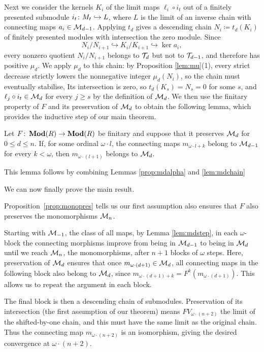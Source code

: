\documentclass[runningheads]{llncs}
\begin{document}
Next we consider the kernels $K_i$ of the limit maps $\ell_i\circ i_t$ out of a finitely presented submodule $i_t\colon M_t\hookrightarrow L$, where $L$ is the limit of an inverse chain with connecting maps $a_i\in\mathcal{M}_{d-1}$.
Applying $t_d$ gives a descending chain $N_i\coloneqq t_d(K_i)$ of finitely presented modules
with intersection the zero module.
Since
\begin{equation*}
N_i/N_{i+1}\hookrightarrow K_i/K_{i+1}\hookrightarrow\ker a_i,
\end{equation*}
every nonzero quotient $N_i/N_{i+1}$ belongs to $\mathcal T_d$ but not to $\mathcal T_{d-1}$, and therefore has positive $\mu_d$.
We apply $\mu_d$ to this chain: by Proposition \ref{lem:mu}(1), every strict decrease strictly lowers the nonnegative integer $\mu_d(N_i)$, so the chain must eventually stabilise,
Its intersection is zero, so $t_d(K_s)=N_s=0$ for some $s$, and $\ell_j\circ i_t\in\mathcal{M}_d$ for every $j\geq s$ by the definition of $\mathcal{M}_d$.
We then use the finitary property of $F$ and its preservation of $\mathcal{M}_d$ to obtain the following lemma, which provides the inductive step of our main theorem.
\begin{lemmaE}
\label{lem:mdstep}
Let $F \colon \operatorname{\mathbf{Mod}}(R) \to \operatorname{\mathbf{Mod}}(R)$ be finitary and suppose that it preserves $\mathcal{M}_d$ for $0\leq d\leq n$.
If, for some ordinal $\omega \cdot l$, the connecting maps $m_{\omega \cdot l + k }$ belong to $\mathcal{M}_{d-1}$ for every $k<\omega$, then $m_{\omega \cdot (l+1)}$ belongs to $\mathcal{M}_d$.
\end{lemmaE}
\begin{proofE}
This lemma follows by combining Lemmas \ref{prop:mdalpha} and  \ref{lem:mdchain}
\end{proofE}
We can now finally prove the main result.
\begin{proofsketch}
Proposition~\ref{prop:monopres} tells us our first assumption also ensures that $F$ also preserves the monomorphisms $\mathcal{M}_n$.

Starting with $\mathcal{M}_{-1}$, the class of all maps, by Lemma \ref{lem:mdstep}, in each $\omega$-block the connecting morphisms improve from being in $\mathcal{M}_{d-1}$ to being in $\mathcal{M}_d$ until we reach $\mathcal{M}_n$, the monomorphisms, after $n+1$ blocks of $\omega$ steps.
Here, preservation of $\mathcal{M}_d$ ensures that once
$m_{\omega\cdot(d+1)}\in\mathcal{M}_d$, all connecting maps in the
following block also belong to $\mathcal{M}_d$, since
$m_{\omega\cdot(d+1)+k} =F^k(m_{\omega\cdot(d+1)}).$
This allows us to repeat the argument in each block.

The final block is then a descending chain of submodules.
Preservation of its intersection (the first assumption of our theorem) means $FV_{\omega\cdot(n+2)}$ the limit of the shifted-by-one chain, and this must have the same limit as the original chain.
Thus the connecting map $m_{\omega\cdot(n+2)}$ is an isomorphism, giving the desired convergence at $\omega\cdot(n+2)$.
\end{proofsketch}
\end{document}
